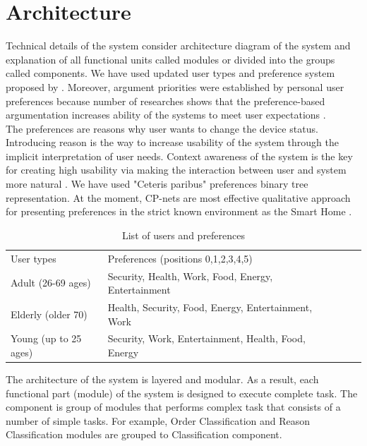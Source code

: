 \documentclass{llncs}
\begin{document}
    \section{Architecture}
    Technical details of the system
    consider architecture diagram of the system and explanation of all functional units called modules
    or divided into the groups called components.
    We have used updated user types and preference system proposed by \cite{9}.
    Moreover, argument priorities were established by personal user preferences \cite{11} because
    number of researches shows that the preference-based argumentation increases ability of the systems to meet user
    expectations \cite{10}.\\
    The preferences are reasons why user wants to change the device status.
    Introducing reason is the way to increase usability of the system through the implicit interpretation of user needs.
    Context awareness of the system is the key for creating high usability via making the interaction
    between user and system more natural \cite{7}.
    We have used "Ceteris paribus" preferences binary tree representation.
    At the moment, CP-nets are most effective qualitative approach for presenting preferences in the strict known
    environment as the Smart Home \cite{10}.\\
    \begin{table}
        \caption{List of users and preferences}
        \begin{tabular}{llllll}
            \hline\noalign{\smallskip}
            User types & Preferences (positions 0,1,2,3,4,5)\\
            \noalign{\smallskip}
            \hline
            \noalign{\smallskip}
            Adult (26-69 ages) & Security, Health, Work, Food, Energy, Entertainment\\
            Elderly (older 70) & Health, Security, Food, Energy, Entertainment, Work\\
            Young (up to 25 ages) & Security, Work, Entertainment, Health, Food, Energy\\
            \hline
        \end{tabular}
    \end{table}
    The architecture of the system is layered and modular.
    As a result, each functional part (module) of the system is designed to execute complete task.
    The component is group of modules that performs complex task that consists of a number of simple tasks.
    For example, Order Classification and Reason Classification modules are grouped to Classification component.\\
\end{document}
